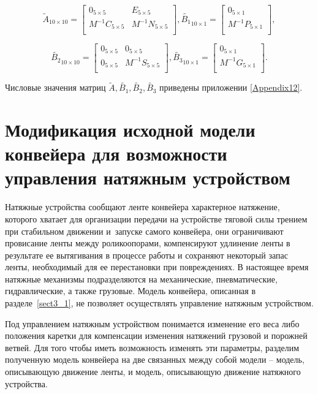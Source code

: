 $$
\tilde{A}_{10\times10} = 
\begin{bmatrix}
 0_{5\times5}       & E_{5 \times 5}      \\
 M^{-1}C_{5\times5} & M^{-1}N_{5\times5}  \\
\end{bmatrix},
\tilde{B_1}_{10\times1} = 
\begin{bmatrix}
 0_{5\times1}                             \\
 M^{-1}P_{5\times1}                       \\
\end{bmatrix},
$$

$$
\tilde{B_2}_{10\times10} = 
\begin{bmatrix}
 0_{5\times5} & 0_{5\times5}              \\
 0_{5\times5} & M^{-1}S_{5\times5}        \\
\end{bmatrix},
\tilde{B_3}_{10\times1} = 
\begin{bmatrix}
 0_{5\times1}                             \\
 M^{-1}G_{5\times1}                       \\
\end{bmatrix}.
$$
\fi 

Числовые значения матриц $ \tilde{A}, \tilde{B_1}, \tilde{B_2}, \tilde{B_3} $ приведены приложении \ref{Appendix12}.

\section{Модификация исходной модели конвейера для возможности управления натяжным устройством} \label{sect3_2}
Натяжные устройства сообщают ленте конвейера характерное натяжение, которого хватает для организации передачи на устройстве тяговой силы трением при стабильном движении и~запуске самого конвейера, они ограничивают провисание ленты между роликоопорами, компенсируют удлинение ленты в результате ее вытягивания в процессе работы и сохраняют некоторый запас ленты, необходимый для ее перестановки при повреждениях. В настоящее время натяжные механизмы подразделяются на механические, пневматические, гидравлические, а также грузовые. Модель конвейера, описанная в разделе~\ref{sect3_1}, не позволяет осуществлять управление натяжным устройством.

Под управлением натяжным устройством понимается изменение его веса либо положения каретки для компенсации изменения натяжений грузовой и порожней ветвей. Для того чтобы иметь возможность изменять эти параметры, разделим полученную модель конвейера на две связанных между собой модели – модель, описывающую движение ленты, и модель, описывающую движение натяжного устройства.

